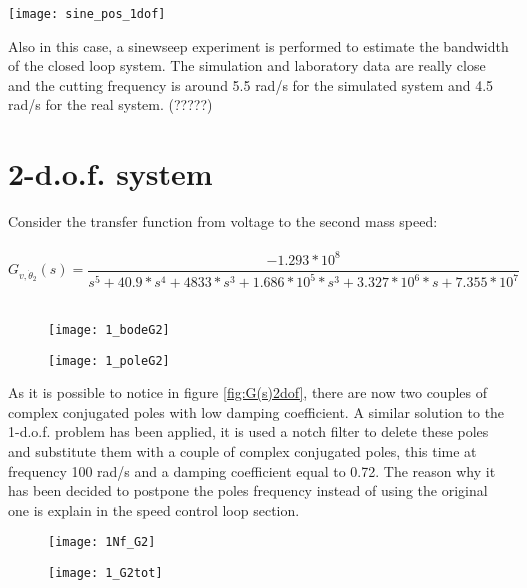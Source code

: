 \begin{figure*}[h]
	\centering
	\texttt{[image: sine\_pos\_1dof]}
	\caption{Sineweep experiment from 0.1 Hz to 1 Hz in 100s}
	\label{fig:sinesweep_pos_1dof}
\end{figure*}

Also in this case, a sinewseep experiment is performed to estimate the bandwidth of the closed loop system. The simulation and laboratory data are really close and the cutting frequency is around 5.5 rad/s for the simulated system and 4.5 rad/s for the real system. (?????)

\newpage

\section{2-d.o.f. system}
Consider the transfer function from voltage to the second mass speed:\\
\\
\[	
G_{v,\dot{\theta}_2}(s)=
\frac{-1.293*10^{8}}{s^5+40.9*s^{4}+4833*s^{3}+1.686*10^{5}*s^{3}+3.327*10^{6}*s+7.355*10^{7}}
\]
\\



\begin{figure*}[h]
	\centering
	\begin{subfigure}{0.4\columnwidth}
		\texttt{[image: 1\_bodeG2]}
	\end{subfigure}
	\begin{subfigure}{0.4\columnwidth}
		\texttt{[image: 1\_poleG2]}
	\end{subfigure}
	\caption{G(s)}
	\label{fig:G(s)2dof}
\end{figure*}

As it is possible to notice in figure \ref{fig:G(s)2dof}, there are now two couples of complex conjugated poles with low damping coefficient. A similar solution to the 1-d.o.f. problem has been applied, it is used a notch filter to delete these poles and substitute them with a couple of complex conjugated poles, this time at frequency 100 rad/s and a damping coefficient equal to 0.72. The reason why it has been decided to postpone the poles frequency instead of using the original one is explain in the speed control loop section.


\begin{figure*}[h]
	\centering
	\begin{subfigure}{0.35\columnwidth}
		\texttt{[image: 1Nf\_G2]}
	\end{subfigure}
	\begin{subfigure}{0.35\columnwidth}
		\texttt{[image: 1\_G2tot]}
	\end{subfigure}
	\caption{Plant G(s) with Notch Filter Nf(s): $G_{tot}$(s)}
	\label{fig:Plant G(s)with Notch Filter2}
\end{figure*}


